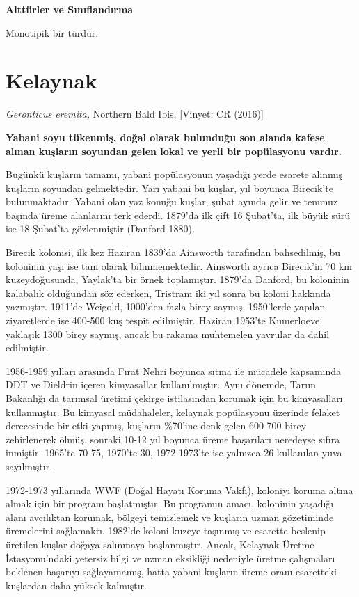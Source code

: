 \documentclass[
  letterpaper,
  DIV=11,
  numbers=noendperiod]{scrreprt}
\begin{document}
\textbf{Alttürler ve Sınıflandırma}

Monotipik bir türdür.

\section{Kelaynak}\label{kelaynak}

\emph{Geronticus eremita,} Northern Bald Ibis, {[}Vinyet: CR (2016){]}

\textbf{Yabani soyu tükenmiş, doğal olarak bulunduğu son alanda kafese
alınan kuşların soyundan gelen lokal ve yerli bir popülasyonu vardır.}

Bugünkü kuşların tamamı, yabani popülasyonun yaşadığı yerde esarete
alınmış kuşların soyundan gelmektedir. Yarı yabani bu kuşlar, yıl
boyunca Birecik'te bulunmaktadır. Yabani olan yaz konuğu kuşlar, şubat
ayında gelir ve temmuz başında üreme alanlarını terk ederdi. 1879'da ilk
çift 16 Şubat'ta, ilk büyük sürü ise 18 Şubat'ta gözlenmiştir (Danford
1880).

Birecik kolonisi, ilk kez Haziran 1839'da Ainsworth tarafından
bahsedilmiş, bu koloninin yaşı ise tam olarak bilinmemektedir. Ainsworth
ayrıca Birecik'in 70 km kuzeydoğusunda, Yaylak'ta bir örnek toplamıştır.
1879'da Danford, bu koloninin kalabalık olduğundan söz ederken, Tristram
iki yıl sonra bu koloni hakkında yazmıştır. 1911'de Weigold, 1000'den
fazla birey saymış, 1950'lerde yapılan ziyaretlerde ise 400-500 kuş
tespit edilmiştir. Haziran 1953'te Kumerloeve, yaklaşık 1300 birey
saymış, ancak bu rakama muhtemelen yavrular da dahil edilmiştir.

1956-1959 yılları arasında Fırat Nehri boyunca sıtma ile mücadele
kapsamında DDT ve Dieldrin içeren kimyasallar kullanılmıştır. Aynı
dönemde, Tarım Bakanlığı da tarımsal üretimi çekirge istilasından
korumak için bu kimyasalları kullanmıştır. Bu kimyasal müdahaleler,
kelaynak popülasyonu üzerinde felaket derecesinde bir etki yapmış,
kuşların \%70'ine denk gelen 600-700 birey zehirlenerek ölmüş, sonraki
10-12 yıl boyunca üreme başarıları neredeyse sıfıra inmiştir. 1965'te
70-75, 1970'te 30, 1972-1973'te ise yalnızca 26 kullanılan yuva
sayılmıştır.

1972-1973 yıllarında WWF (Doğal Hayatı Koruma Vakfı), koloniyi koruma
altına almak için bir program başlatmıştır. Bu programın amacı,
koloninin yaşadığı alanı avcılıktan korumak, bölgeyi temizlemek ve
kuşların uzman gözetiminde üremelerini sağlamaktı. 1982'de koloni kuzeye
taşınmış ve esarette beslenip üretilen kuşlar doğaya salınmaya
başlanmıştır. Ancak, Kelaynak Üretme İstasyonu'ndaki yetersiz bilgi ve
uzman eksikliği nedeniyle üretme çalışmaları beklenen başarıyı
sağlayamamış, hatta yabani kuşların üreme oranı esaretteki kuşlardan
daha yüksek kalmıştır.
\end{document}
